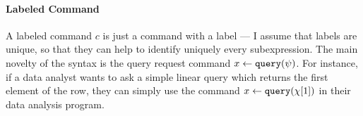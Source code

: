 % 

\paragraph*{Labeled Command}
 A labeled command $c$ is just a command with a label --- I assume that labels are unique, so that they can help to identify uniquely every subexpression. 
 The main novelty of the syntax is the query request command $\mathrel{ x \leftarrow {\tt query}(\psi) }$. 
 For instance, if a data analyst wants to ask a simple linear query which returns the first element of the row, 
 they can simply use the command $ \mathrel{ x \leftarrow {\tt query}(\chi[1]) }$ in their data analysis program.
%

